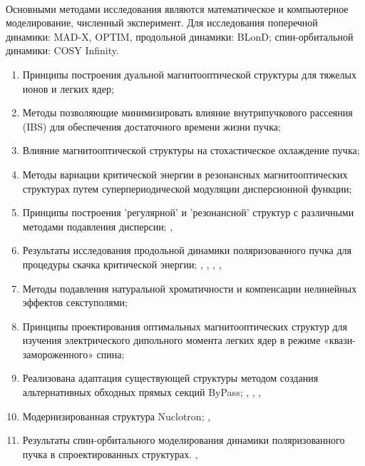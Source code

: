 ~\\
\par {\methods} Основными методами исследования являются математическое и компьютерное моделирование, численный эксперимент. Для исследования поперечной динамики: MAD-X, OPTIM, продольной динамики: BLonD; спин-орбитальной динамики: COSY Infinity.
~\\
\par {}
\begin{enumerate}[beginpenalty=10000] %
  \item Принципы построения дуальной магнитооптической структуры для тяжелых ионов и легких ядер; \cite{Kolokolchikov:2025_dual}
  \item	Методы позволяющие минимизировать влияние внутрипучкового рассеяния (IBS) для обеспечения достаточного времени жизни пучка; 
  \item	Влияние магнитооптической структуры на стохастическое охлаждение пучка;
  \item	Методы вариации критической энергии в резонансных магнитооптических структурах путем суперпериодической модуляции дисперсионной функции; \cite{Kolokolchikov:2021trans}
  \item	Принципы построения 'регулярной' и 'резонансной' структур с различными методами подавления дисперсии; \cite{Kolokolchikov:2023_pecular}, \cite{Syresin:2021_polar}
  \item	Результаты исследования продольной динамики поляризованного пучка для процедуры скачка критической энергии; \cite{Kolokolchikov:2025_U70}, \cite{Kolokolchikov:2025_jump}, \cite{Kolokolchikov:2024_bb_rupac}, \cite{Kolokolchikov:2023_bb_IPAC}, \cite{Kolokolchikov:2024_bb_dspin}
  \item	Методы подавления натуральной хроматичности и компенсации нелинейных эффектов секступолями;
  \item	Принципы проектирования оптимальных магнитооптических структур для изучения электрического дипольного момента легких ядер в режиме «квази-замороженного» спина; \cite{Senichev:2023_QFS}
  \item	Реализована адаптация существующей структуры методом создания альтернативных обходных прямых секций ByPass; \cite{Kolokolchikov:2023_bypass}, \cite{Kolokolchikov:2023_bypass_IPAC}, \cite{Senichev:2024_nica_edm}, 
  \item 	Модернизированная структура Nuclotron; \cite{Senichev:2023_nuclotron}, \cite{Kolokolchikov:2025_nuclotron}
  \item	Результаты спин-орбитального моделирования динамики поляризованного пучка в спроектированных структурах. \cite{Kolokolchikov:2023_sc}, \cite{Kolokolchikov:2023_sc_IPAC}
\end{enumerate}
